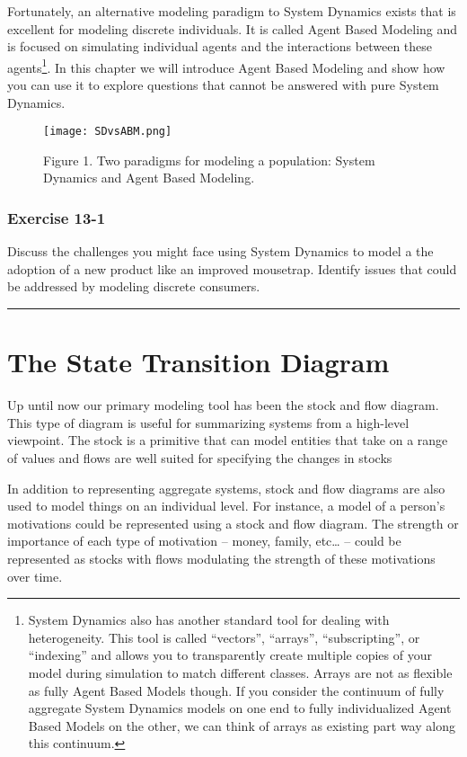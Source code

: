 \documentclass[]{memoir}
\makeatletter
\def\maxwidth{\ifdim\Gin@nat@width>\linewidth\linewidth
\else\Gin@nat@width\fi}
\let\Oldincludegraphics\includegraphics
\renewcommand{\includegraphics}[1]{\Oldincludegraphics[width=\maxwidth]{#1}}
\makeatother
\begin{document}
Fortunately, an alternative modeling paradigm to System Dynamics exists
that is excellent for modeling discrete individuals. It is called Agent
Based Modeling and is focused on simulating individual agents and the
interactions between these agents\footnote{System Dynamics also has
  another standard tool for dealing with heterogeneity. This tool is
  called ``vectors'', ``arrays'', ``subscripting'', or ``indexing'' and
  allows you to transparently create multiple copies of your model
  during simulation to match different classes. Arrays are not as
  flexible as fully Agent Based Models though. If you consider the
  continuum of fully aggregate System Dynamics models on one end to
  fully individualized Agent Based Models on the other, we can think of
  arrays as existing part way along this continuum.}. In this chapter we
will introduce Agent Based Modeling and show how you can use it to
explore questions that cannot be answered with pure System Dynamics.

\begin{figure}[htbp]
\centering
\texttt{[image: SDvsABM.png]}
\caption{Figure 1. Two paradigms for modeling a population: System
Dynamics and Agent Based Modeling.}
\end{figure}

\subsubsection{Exercise 13-1}

Discuss the challenges you might face using System Dynamics to model a
the adoption of a new product like an improved mousetrap. Identify
issues that could be addressed by modeling discrete consumers.

\begin{center}\rule{3in}{0.4pt}\end{center}

\section{The State Transition Diagram}

Up until now our primary modeling tool has been the stock and flow
diagram. This type of diagram is useful for summarizing systems from a
high-level viewpoint. The stock is a primitive that can model entities
that take on a range of values and flows are well suited for specifying
the changes in stocks

In addition to representing aggregate systems, stock and flow diagrams
are also used to model things on an individual level. For instance, a
model of a person's motivations could be represented using a stock and
flow diagram. The strength or importance of each type of motivation --
money, family, etc\ldots{} -- could be represented as stocks with flows
modulating the strength of these motivations over time.
\end{document}
